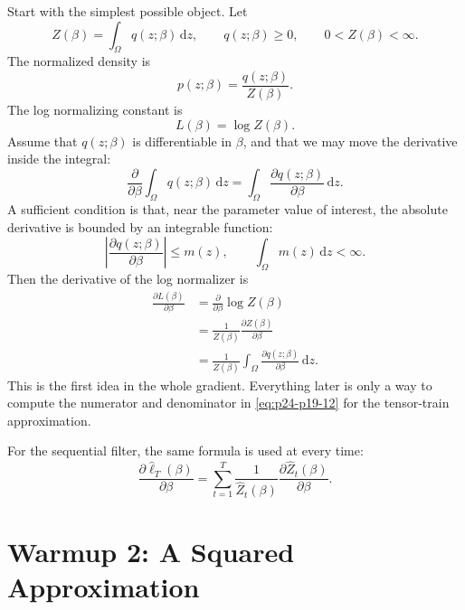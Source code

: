 \documentclass[11pt]{article}
\newcommand{\dd}{\,\mathrm d}
\newcommand{\widehatell}{\widehat\ell}
\begin{document}
Start with the simplest possible object.  Let
\[
    Z(\beta)=\int_\Omega q(z;\beta)\dd z,
    \qquad
    q(z;\beta)\ge 0,
    \qquad
    0<Z(\beta)<\infty.
    \label{eq:p24-p19-7}
\]
The normalized density is
\[
    p(z;\beta)=\frac{q(z;\beta)}{Z(\beta)}.
    \label{eq:p24-p19-8}
\]
The log normalizing constant is
\[
    L(\beta)=\log Z(\beta).
    \label{eq:p24-p19-9}
\]
Assume that \(q(z;\beta)\) is differentiable in \(\beta\), and that we may move
the derivative inside the integral:
\[
    \frac{\partial}{\partial\beta}
    \int_\Omega q(z;\beta)\dd z
    =
    \int_\Omega
    \frac{\partial q(z;\beta)}{\partial\beta}\dd z.
    \label{eq:p24-p19-10}
\]
A sufficient condition is that, near the parameter value of interest, the
absolute derivative is bounded by an integrable function:
\[
    \left|
    \frac{\partial q(z;\beta)}{\partial\beta}
    \right|
    \le m(z),
    \qquad
    \int_\Omega m(z)\dd z<\infty.
    \label{eq:p24-p19-11}
\]
Then the derivative of the log normalizer is
\[
\begin{aligned}
    \frac{\partial L(\beta)}{\partial\beta}
    &=
    \frac{\partial}{\partial\beta}\log Z(\beta)\\
    &=
    \frac{1}{Z(\beta)}
    \frac{\partial Z(\beta)}{\partial\beta}\\
    &=
    \frac{1}{Z(\beta)}
    \int_\Omega
    \frac{\partial q(z;\beta)}{\partial\beta}\dd z.
\end{aligned}
\label{eq:p24-p19-12}
\]
This is the first idea in the whole gradient.  Everything later is only a way
to compute the numerator and denominator in \eqref{eq:p24-p19-12} for the tensor-train
approximation.

For the sequential filter, the same formula is used at every time:
\[
    \frac{\partial\widehatell_T(\beta)}{\partial\beta}
    =
    \sum_{t=1}^{T}
    \frac{1}{\widehat Z_t(\beta)}
    \frac{\partial\widehat Z_t(\beta)}{\partial\beta}.
    \label{eq:p24-p19-13}
\]

\section{Warmup 2: A Squared Approximation}
\end{document}
